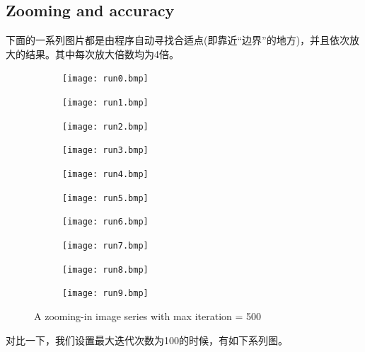 \documentclass{ctexart}
\begin{document}
\subsection{Zooming and accuracy}
下面的一系列图片都是由程序自动寻找合适点(即靠近“边界”的地方)，并且依次放大的结果。其中每次放大倍数均为4倍。
\begin{figure}[H]
\begin{subfigure}{0.16\textwidth}
	\centering
	\texttt{[image: run0.bmp]}
\end{subfigure}
\begin{subfigure}{0.16\textwidth}
	\centering
	\texttt{[image: run1.bmp]}
\end{subfigure}
\begin{subfigure}{0.16\textwidth}
	\centering
	\texttt{[image: run2.bmp]}
\end{subfigure}
\begin{subfigure}{0.16\textwidth}
	\centering
	\texttt{[image: run3.bmp]}
\end{subfigure}
\begin{subfigure}{0.16\textwidth}
	\centering
	\texttt{[image: run4.bmp]}
\end{subfigure}
\begin{subfigure}{0.16\textwidth}
	\centering
	\texttt{[image: run5.bmp]}
\end{subfigure}
\begin{subfigure}{0.16\textwidth}
	\centering
	\texttt{[image: run6.bmp]}
\end{subfigure}
\begin{subfigure}{0.16\textwidth}
	\centering
	\texttt{[image: run7.bmp]}
\end{subfigure}
\begin{subfigure}{0.16\textwidth}
	\centering
	\texttt{[image: run8.bmp]}
\end{subfigure}
\begin{subfigure}{0.16\textwidth}
	\centering
	\texttt{[image: run9.bmp]}
\end{subfigure}
\caption{A zooming-in image series with max iteration = 500}

\end{figure}
对比一下，我们设置最大迭代次数为100的时候，有如下系列图。
\end{document}
